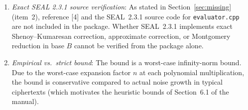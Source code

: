 \documentclass[11pt]{article}
\theoremstyle{plain}
\theoremstyle{definition}
\theoremstyle{remark}
\begin{document}
\begin{enumerate}[leftmargin=2em]
\begin{enumerate}[label=(\alph*)]
      \item \emph{Exact SEAL 2.3.1 source verification}: As stated in Section~\ref{sec:missing} (item~2),
            reference [4] and the SEAL~2.3.1 source code for \texttt{evaluator.cpp} are not included in the
            package. Whether SEAL~2.3.1 implements exact Shenoy--Kumaresan correction, approximate correction,
            or Montgomery reduction in base $B$ cannot be verified from the package alone.
      \item \emph{Empirical vs.\ strict bound}: The bound is a worst-case infinity-norm bound. Due to the
            worst-case expansion factor $n$ at each polynomial multiplication, the bound is conservative
            compared to actual noise growth in typical ciphertexts (which motivates the heuristic bounds of
            Section~6.1 of the manual).
      \end{enumerate}
\end{enumerate}
\end{document}
